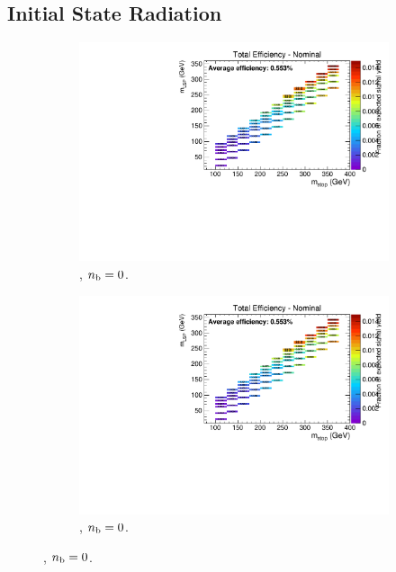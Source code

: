 \subsection*{Initial State Radiation}
\label{sec:t2cc_isr_plots}

\begin{figure}[ht!]
  \centering
  \begin{subfigure}[b]{0.32\textwidth}
    \includegraphics[width=\textwidth, page=4]{Figs/sms/t2cc/v24/ISR_T2cc_v24_eq0b_le3j_incl.pdf}
    \caption{\njlow, $n_{\text{b}} = 0$.}
  \end{subfigure}
  \begin{subfigure}[b]{0.32\textwidth}
    \includegraphics[width=\textwidth, page=5]{Figs/sms/t2cc/v24/ISR_T2cc_v24_eq0b_le3j_incl.pdf}
    \caption{\njlow, $n_{\text{b}} = 0$.}
  \end{subfigure}

\end{figure}
